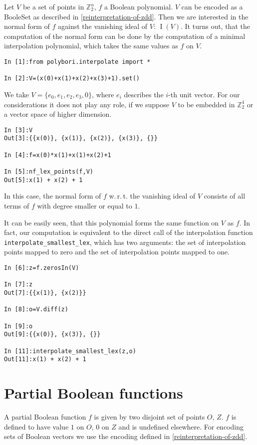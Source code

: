 \documentclass[]{article}
\DeclareMathOperator{\I}{I}
\newcommand{\Ztwo}{\mathbb{Z}_2}
\begin{document}
Let $V$ be a set of points in $\Ztwo^n$, $f$ a Boolean polynomial. $V$ can be encoded as a BooleSet as described in \ref{reinterpretation-of-zdd}.
Then we are interested in the normal form of $f$ against the vanishing ideal of $V$: $\I(V)$.
It turns out, that the computation of the normal form can be done by the computation of a minimal interpolation polynomial, which takes the same values as $f$ on $V$.

\begin{lstlisting}
In [1]:from polybori.interpolate import *

In [2]:V=(x(0)+x(1)+x(2)+x(3)+1).set()
\end{lstlisting}

We take $V=\{e_0,e_1,e_2,e_3,0\}$, where $e_i$ describes the $i$-th unit vector. For our considerations it does not play any role, if we suppose $V$ to be embedded in $\Ztwo^4$ or a vector space of higher dimension.

\begin{lstlisting}
In [3]:V
Out[3]:{{x(0)}, {x(1)}, {x(2)}, {x(3)}, {}}

In [4]:f=x(0)*x(1)+x(1)+x(2)+1

In [5]:nf_lex_points(f,V)
Out[5]:x(1) + x(2) + 1
\end{lstlisting}

In this case, the normal form of $f$ w.\,r.\,t. the vanishing ideal of $V$ consists of all terms of $f$ with degree smaller or equal to $1$.

It can be easily seen, that this polynomial forms the same function on $V$ as $f$.
In fact, our computation is equivalent to the direct call of the interpolation function \lstinline|interpolate_smallest_lex|, which has two arguments: the set of interpolation points mapped to zero and the set of interpolation points mapped to one.

\begin{lstlisting}
In [6]:z=f.zerosIn(V)

In [7]:z
Out[7]:{{x(1)}, {x(2)}}

In [8]:o=V.diff(z)

In [9]:o
Out[9]:{{x(0)}, {x(3)}, {}}

In [11]:interpolate_smallest_lex(z,o)
Out[11]:x(1) + x(2) + 1
\end{lstlisting}
\section{Partial Boolean functions}
A partial Boolean function $f$ is given by two disjoint set of points $O$, $Z$.
$f$ is defined to have value $1$ on $O$, $0$ on $Z$ and is undefined elsewhere.
For encoding sets of Boolean vectors we use the encoding defined in \ref{reinterpretation-of-zdd}.
\end{document}
